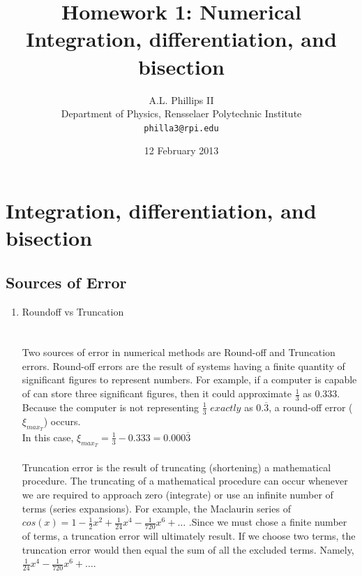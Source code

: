 \documentclass{report}
\begin{document}
\title{\textbf{Homework 1:} Numerical Integration, differentiation, and bisection}
\author{A.L. Phillips II\\
  Department of Physics,%
  Rensselaer Polytechnic Institute\\
  \texttt{philla3@rpi.edu}}
\date{12 February 2013}
\maketitle
\chapter{Integration, differentiation, and bisection}

\section{Sources of Error}
\begin{enumerate}
\item Roundoff vs Truncation
\\
\\
\\Two sources of error in numerical methods are Round-off and Truncation errors. Round-off errors are the result of systems having a finite quantity of significant figures to represent numbers. For example, if a computer is capable of can store three significant figures, then it could approximate $ \frac{1}{3}$ as $0.333$. Because the computer is not representing $ \frac{1}{3}$ $exactly$ as $0.\overline{3}$, a round-off error ($\xi_{max_{T}}$) occurs. 
\\In this case, $\displaystyle \xi_{max_{T}} = \frac{1}{3} - 0.333 = 0.000\overline{3} $
\\
\\Truncation error is the result of truncating (shortening) a mathematical procedure. The truncating of a mathematical procedure can occur whenever we are required to approach zero (integrate) or use an infinite number of terms (series expansions). For example, the Maclaurin series of $cos(x) = 1 - \frac{1}{2}x^2 + \frac{1}{24}x^4 - \frac{1}{720}x^6 + \ldots$ .Since we must chose a finite number of terms, a truncation error will ultimately result. If we choose two terms, the truncation error would then equal the sum of all the excluded terms. Namely, $\frac{1}{24}x^4 - \frac{1}{720}x^6 + \ldots$.  

\end{enumerate}
\end{document}
